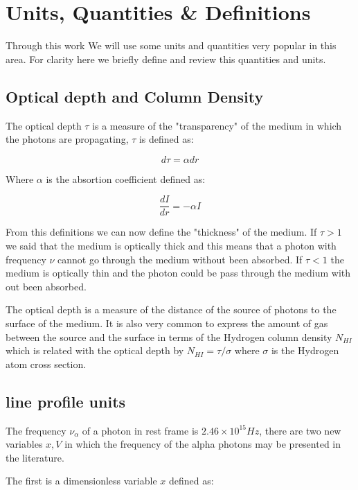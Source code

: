 \section{Units, Quantities \& Definitions}

Through this work We will use some units and quantities very popular in 
this area. For clarity here we briefly define and review this 
quantities and units.

\subsection{Optical depth and Column Density}

The optical depth $\tau$ is a measure of the "transparency" of the medium
in which the photons are propagating, $\tau$ is defined as:

\begin{equation}
d\tau = \alpha dr
\end{equation}

Where $\alpha$ is the absortion coefficient defined as:

\begin{equation}
\dfrac{dI}{dr} = -\alpha I
\end{equation}

From this definitions we can now define the "thickness" of the medium.
If $\tau > 1$ we said that the medium is optically thick and this means
that a photon with frequency $\nu$ cannot go through the medium without been
absorbed. If $\tau < 1$ the medium is optically thin and the photon
could be pass through the medium with out been absorbed.

The optical depth is a measure of the distance of the source
of photons to the surface of the medium. It is also very common 
to express the amount of gas between the \ly source and the surface
in terms of the Hydrogen column density 
$N_{HI}$ which is related with the optical depth by $N_{HI} = \tau/\sigma$
where $\sigma$ is the Hydrogen atom cross section. 

\subsection{\ly line profile units}

The frequency $\nu_{\alpha}$ of a \ly photon in rest frame is
$2.46\times 10^{15}Hz$,
there are two new variables $x, V$ in which the frequency of 
the \ly alpha photons may be presented in the literature.

The first is a dimensionless variable $x$ defined as:

